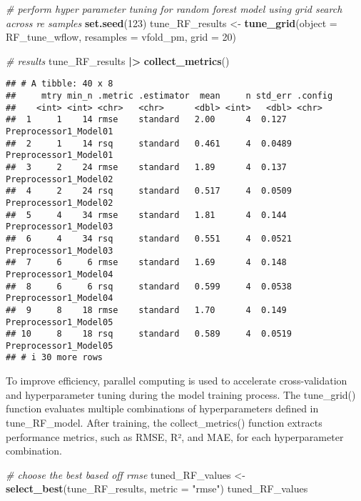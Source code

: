 \documentclass[
]{article}
\newenvironment{Shaded}{\begin{snugshade}}{\end{snugshade}}
\newcommand{\AttributeTok}[1]{\textcolor[rgb]{0.13,0.29,0.53}{#1}}
\newcommand{\CommentTok}[1]{\textcolor[rgb]{0.56,0.35,0.01}{\textit{#1}}}
\newcommand{\DecValTok}[1]{\textcolor[rgb]{0.00,0.00,0.81}{#1}}
\newcommand{\FunctionTok}[1]{\textcolor[rgb]{0.13,0.29,0.53}{\textbf{#1}}}
\newcommand{\NormalTok}[1]{#1}
\newcommand{\OtherTok}[1]{\textcolor[rgb]{0.56,0.35,0.01}{#1}}
\newcommand{\SpecialCharTok}[1]{\textcolor[rgb]{0.81,0.36,0.00}{\textbf{#1}}}
\newcommand{\StringTok}[1]{\textcolor[rgb]{0.31,0.60,0.02}{#1}}
\begin{document}
\begin{Shaded}
\begin{Highlighting}[]
\CommentTok{\# perform hyper parameter tuning for random forest model using grid search across re samples}
\FunctionTok{set.seed}\NormalTok{(}\DecValTok{123}\NormalTok{)}
\NormalTok{tune\_RF\_results }\OtherTok{\textless{}{-}} \FunctionTok{tune\_grid}\NormalTok{(}\AttributeTok{object =}\NormalTok{ RF\_tune\_wflow, }\AttributeTok{resamples =}\NormalTok{ vfold\_pm, }\AttributeTok{grid =} \DecValTok{20}\NormalTok{)}

\CommentTok{\# results}
\NormalTok{tune\_RF\_results }\SpecialCharTok{|\textgreater{}}
  \FunctionTok{collect\_metrics}\NormalTok{()}
\end{Highlighting}
\end{Shaded}

\begin{verbatim}
## # A tibble: 40 x 8
##     mtry min_n .metric .estimator  mean     n std_err .config              
##    <int> <int> <chr>   <chr>      <dbl> <int>   <dbl> <chr>                
##  1     1    14 rmse    standard   2.00      4  0.127  Preprocessor1_Model01
##  2     1    14 rsq     standard   0.461     4  0.0489 Preprocessor1_Model01
##  3     2    24 rmse    standard   1.89      4  0.137  Preprocessor1_Model02
##  4     2    24 rsq     standard   0.517     4  0.0509 Preprocessor1_Model02
##  5     4    34 rmse    standard   1.81      4  0.144  Preprocessor1_Model03
##  6     4    34 rsq     standard   0.551     4  0.0521 Preprocessor1_Model03
##  7     6     6 rmse    standard   1.69      4  0.148  Preprocessor1_Model04
##  8     6     6 rsq     standard   0.599     4  0.0538 Preprocessor1_Model04
##  9     8    18 rmse    standard   1.70      4  0.149  Preprocessor1_Model05
## 10     8    18 rsq     standard   0.589     4  0.0519 Preprocessor1_Model05
## # i 30 more rows
\end{verbatim}

To improve efficiency, parallel computing is used to accelerate
cross-validation and hyperparameter tuning during the model training
process. The tune\_grid() function evaluates multiple combinations of
hyperparameters defined in tune\_RF\_model. After training, the
collect\_metrics() function extracts performance metrics, such as RMSE,
R², and MAE, for each hyperparameter combination.

\begin{Shaded}
\begin{Highlighting}[]
\CommentTok{\# choose the best based off rmse}
\NormalTok{tuned\_RF\_values }\OtherTok{\textless{}{-}} \FunctionTok{select\_best}\NormalTok{(tune\_RF\_results, }\AttributeTok{metric =} \StringTok{"rmse"}\NormalTok{)}
\NormalTok{tuned\_RF\_values}
\end{Highlighting}
\end{Shaded}
\end{document}
